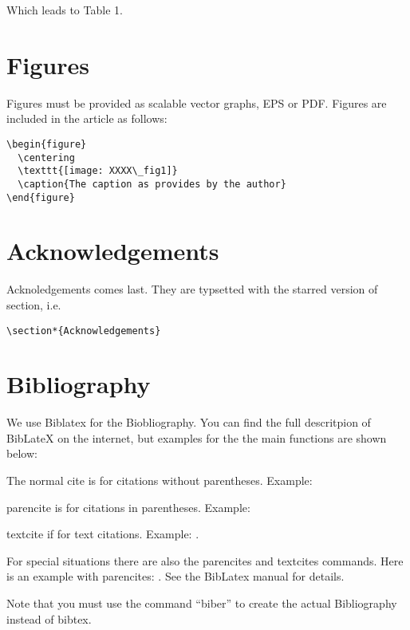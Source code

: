 Which leads to Table 1.




\section{Figures}


Figures must be provided as scalable vector graphs, EPS or
PDF. Figures are included in the article as follows:

\begin{verbatim}
\begin{figure}
  \centering
  \texttt{[image: XXXX\_fig1]}
  \caption{The caption as provides by the author}
\end{figure}
\end{verbatim}

\section*{Acknowledgements}

Acknoledgements comes last. They are typsetted with the starred
version of section, i.e. 

\begin{verbatim}
\section*{Acknowledgements}
\end{verbatim}

\section{Bibliography}

We use Biblatex for the Biobliography. You can find the full
descritpion of BibLateX on the internet, but examples for the the main
functions are shown below:

\bci
\item The normal cite is for citations without parentheses. Example:
  \cite[see][pg.\,12]{carrasco03}
\item parencite is for citations in parentheses. Example:
  \parencite[see][pg.\,12]{dept10}
\item textcite if for text citations. Example: 
  \textcite[see][pg.\,12]{dorer11}.
\item For special situations there are also the parencites and
  textcites commands. Here is an example with parencites: 
  \parencites(See)(and the
  introduction)[35]{fitzgerald11}[78]{dorer11}[23]{goerman07}. See the
  BibLatex manual for details. 
\eci

Note that you must use the command ``biber'' to create the actual
Bibliography instead of bibtex. 



